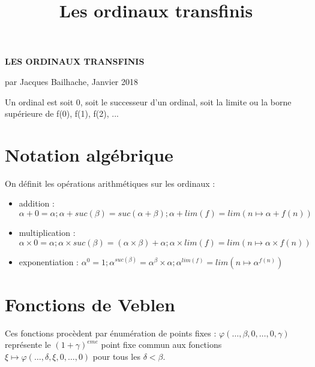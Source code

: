 \documentclass[8pt]{article}
\title{Les ordinaux transfinis}
\begin{document}
\setlength{\parindent}{0pt}

\vspace{-0.4cm}

\begin{center}
\textbf{LES ORDINAUX TRANSFINIS}

par Jacques Bailhache, Janvier 2018
\end{center}

\vspace{-0.2cm}

Un ordinal est soit 0, soit le successeur d'un ordinal, soit la limite ou la borne supérieure de f(0), f(1), f(2), ...
\vspace{-0.7cm}

\section{Notation algébrique}
\vspace{-0.4cm}
On définit les opérations arithmétiques sur les ordinaux :
\vspace{-0.4cm}
\smallskip
\begin{itemize}
     \setlength{\itemsep}{1pt}
     \setlength{\parskip}{0pt}
     \setlength{\parsep}{0pt}
\item addition : \( \alpha+0=\alpha ; \alpha+suc(\beta)=suc(\alpha+\beta); \alpha+lim(f)=lim(n \mapsto \alpha+f(n)) \)
\vspace{-0.1cm}
\item multiplication : \( \alpha \times 0 = \alpha ; \alpha \times suc(\beta) = (\alpha \times \beta) + \alpha ; \alpha \times lim(f) = lim (n \mapsto \alpha \times f(n)) \)
\vspace{-0.1cm}
\item exponentiation : \( \alpha^0 = 1 ; \alpha^{suc(\beta)} = \alpha^\beta \times \alpha ; \alpha^{lim(f)} = lim (n \mapsto \alpha^{f(n)}) \)
\end{itemize}
\vspace{-0.8cm}

\section{Fonctions de Veblen}
\vspace{-0.4cm}
Ces fonctions procèdent par énumération de points fixes : \(\varphi(\ldots,\beta,0,\ldots,0,\gamma) \) représente le \((1+\gamma)^{eme}\) point fixe commun aux fonctions \( \xi \mapsto \varphi(\ldots,\delta,\xi,0,\ldots,0)\) pour tous les \(\delta < \beta\).
\vspace{-0.6cm}
\end{document}
